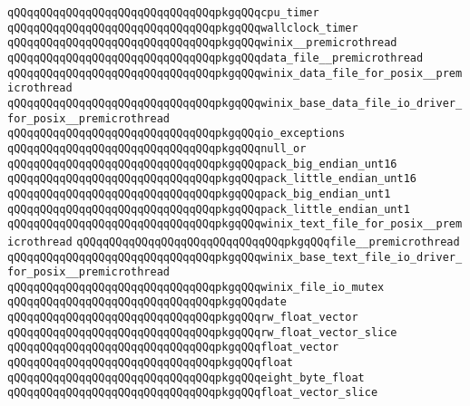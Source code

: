 \verb|qQQqqQQqqQQqqQQqqQQqqQQqqQQqqQQqpkgqQQqcpu_timer|\newline
\verb|qQQqqQQqqQQqqQQqqQQqqQQqqQQqqQQqpkgqQQqwallclock_timer|\newline
\verb|qQQqqQQqqQQqqQQqqQQqqQQqqQQqqQQqpkgqQQqwinix__premicrothread|\newline
\verb|qQQqqQQqqQQqqQQqqQQqqQQqqQQqqQQqpkgqQQqdata_file__premicrothread|\newline
\verb|qQQqqQQqqQQqqQQqqQQqqQQqqQQqqQQqpkgqQQqwinix_data_file_for_posix__premicrothread|\newline
\verb|qQQqqQQqqQQqqQQqqQQqqQQqqQQqqQQqpkgqQQqwinix_base_data_file_io_driver_for_posix__premicrothread|\newline
\verb|qQQqqQQqqQQqqQQqqQQqqQQqqQQqqQQqpkgqQQqio_exceptions|\newline
\verb|qQQqqQQqqQQqqQQqqQQqqQQqqQQqqQQqpkgqQQqnull_or|\newline
\verb|qQQqqQQqqQQqqQQqqQQqqQQqqQQqqQQqpkgqQQqpack_big_endian_unt16|\newline
\verb|qQQqqQQqqQQqqQQqqQQqqQQqqQQqqQQqpkgqQQqpack_little_endian_unt16|\newline
\verb|qQQqqQQqqQQqqQQqqQQqqQQqqQQqqQQqpkgqQQqpack_big_endian_unt1|\newline
\verb|qQQqqQQqqQQqqQQqqQQqqQQqqQQqqQQqpkgqQQqpack_little_endian_unt1|\newline
\verb|qQQqqQQqqQQqqQQqqQQqqQQqqQQqqQQqpkgqQQqwinix_text_file_for_posix__premicrothread|\newline
\verb|qQQqqQQqqQQqqQQqqQQqqQQqqQQqqQQqpkgqQQqfile__premicrothread|\newline
\verb|qQQqqQQqqQQqqQQqqQQqqQQqqQQqqQQqpkgqQQqwinix_base_text_file_io_driver_for_posix__premicrothread|\newline
\verb|qQQqqQQqqQQqqQQqqQQqqQQqqQQqqQQqpkgqQQqwinix_file_io_mutex|\newline
\verb|qQQqqQQqqQQqqQQqqQQqqQQqqQQqqQQqpkgqQQqdate|\newline
\verb|qQQqqQQqqQQqqQQqqQQqqQQqqQQqqQQqpkgqQQqrw_float_vector|\newline
\verb|qQQqqQQqqQQqqQQqqQQqqQQqqQQqqQQqpkgqQQqrw_float_vector_slice|\newline
\verb|qQQqqQQqqQQqqQQqqQQqqQQqqQQqqQQqpkgqQQqfloat_vector|\newline
\verb|qQQqqQQqqQQqqQQqqQQqqQQqqQQqqQQqpkgqQQqfloat|\newline
\verb|qQQqqQQqqQQqqQQqqQQqqQQqqQQqqQQqpkgqQQqeight_byte_float|\newline
\verb|qQQqqQQqqQQqqQQqqQQqqQQqqQQqqQQqpkgqQQqfloat_vector_slice|\newline
